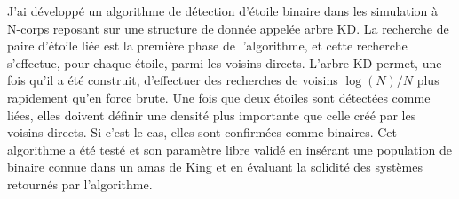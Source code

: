J'ai d\'evelopp\'e un algorithme de d\'etection d'\'etoile binaire dans les simulation \`a N-corps reposant sur une structure de donn\'ee appel\'ee arbre KD. La recherche de paire d'\'etoile li\'ee est la premi\`ere phase de l'algorithme, et cette recherche s'effectue, pour chaque \'etoile, parmi les voisins directs. L'arbre KD permet, une fois qu'il a \'et\'e construit, d'effectuer des recherches de voisins $\log(N)/N$ plus rapidement qu'en force brute. Une fois que deux \'etoiles sont d\'etect\'ees comme li\'ees, elles doivent d\'efinir une densit\'e plus importante que celle cr\'e\'e par les voisins directs. Si c'est le cas, elles sont confirm\'ees comme binaires. Cet algorithme a \'et\'e test\'e et son param\`etre libre valid\'e en ins\'erant une population de binaire connue dans un amas de King et en \'evaluant la solidit\'e des syst\`emes retourn\'es par l'algorithme.



